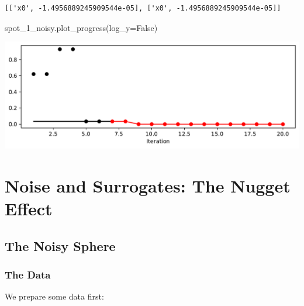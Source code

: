 \documentclass[
  letterpaper,
  DIV=11,
  numbers=noendperiod]{scrreprt}
\newenvironment{Shaded}{\begin{snugshade}}{\end{snugshade}}
\newcommand{\NormalTok}[1]{\textcolor[rgb]{0.00,0.23,0.31}{#1}}
\newcommand{\OperatorTok}[1]{\textcolor[rgb]{0.37,0.37,0.37}{#1}}
\newcommand{\VariableTok}[1]{\textcolor[rgb]{0.07,0.07,0.07}{#1}}
\begin{document}
\begin{verbatim}
[['x0', -1.4956889245909544e-05], ['x0', -1.4956889245909544e-05]]
\end{verbatim}

\begin{Shaded}
\begin{Highlighting}[]
\NormalTok{spot\_1\_noisy.plot\_progress(log\_y}\OperatorTok{=}\VariableTok{False}\NormalTok{)}
\end{Highlighting}
\end{Shaded}

\includegraphics{014_num_spot_ocba_files/figure-pdf/cell-8-output-1.pdf}

\section{Noise and Surrogates: The Nugget
Effect}\label{noise-and-surrogates-the-nugget-effect-1}

\subsection{The Noisy Sphere}\label{the-noisy-sphere-1}

\subsubsection{The Data}\label{the-data-1}

We prepare some data first:
\end{document}
